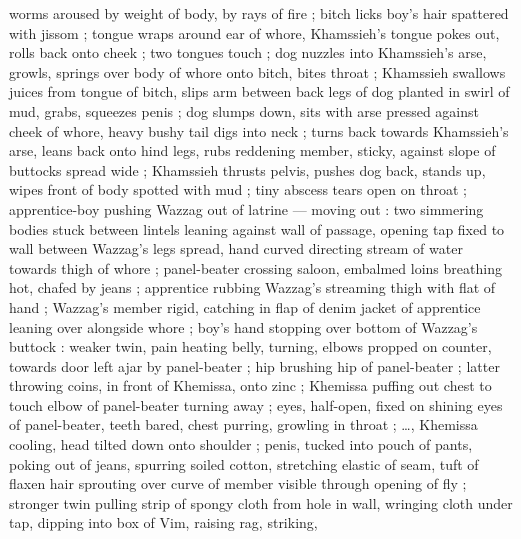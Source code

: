 {worms aroused by weight of body, by rays of fire ; bitch licks boy's hair spattered with jissom ; tongue wraps around ear of whore, Khamssieh's tongue pokes out, rolls back onto cheek ; two tongues touch ; dog nuzzles into Khamssieh's arse, growls, springs over body of whore onto bitch, bites throat ; Khamssieh swallows juices from tongue of bitch, slips arm between back legs of dog planted in swirl of mud, grabs, squeezes penis ; dog slumps down, sits with arse pressed against cheek of whore, heavy bushy tail digs into neck ; turns back towards Khamssieh's arse, leans back onto hind legs, rubs reddening member, sticky, against slope of buttocks spread wide ; Khamssieh thrusts pelvis, pushes dog back, stands up, wipes front of body spotted with mud ; tiny abscess tears open on throat{\td}} ; apprentice-boy pushing Wazzag out of latrine --- moving out : two simmering bodies stuck between lintels {\dashcom} leaning against wall of passage, opening tap fixed to wall between Wazzag's legs spread, hand curved directing stream of water towards thigh of whore ; panel-beater crossing saloon, embalmed loins breathing hot, chafed by jeans ; apprentice rubbing Wazzag's streaming thigh with flat of hand ; Wazzag's member rigid, catching in flap of denim jacket of apprentice leaning over alongside whore ; boy's hand stopping over bottom of Wazzag's buttock{\td}  : weaker twin, pain heating belly, turning, elbows propped on counter, towards door left ajar by panel-beater ; hip brushing hip of panel-beater ; latter throwing coins, in front of Khemissa, onto zinc ; Khemissa puffing out chest to touch elbow of panel-beater turning away ; eyes, half-open, fixed on shining eyes of panel-beater, teeth bared, chest purring, growling in throat ; {\ldots}, Khemissa cooling, head tilted down onto shoulder ; penis, tucked into pouch of pants, poking out of jeans, spurring soiled cotton, stretching elastic of seam, tuft of flaxen hair sprouting over curve of member visible through opening of fly ; stronger twin pulling strip of spongy cloth from hole in wall, wringing cloth under tap, dipping into box of Vim, raising rag, striking, 
